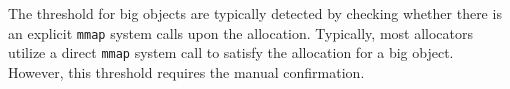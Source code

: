 The threshold for big objects are typically detected by checking whether there is an explicit \texttt{mmap} system calls upon the allocation. Typically, most allocators utilize a direct \texttt{mmap} system call to satisfy the allocation for a big object. However, this threshold requires the manual confirmation. 

